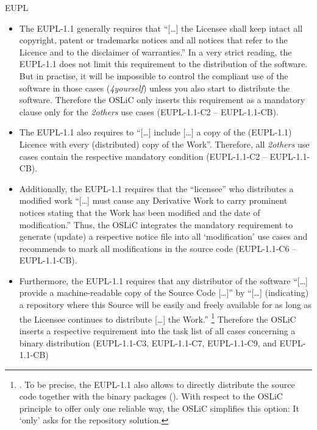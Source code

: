\begin{license}{EUPL}
\begin{itemize}
\item The EUPL-1.1 generally requires that \enquote{[\ldots] the Licensee shall
  keep intact all copyright, patent or trademarks notices and all notices that
  refer to the Licence and to the disclaimer of warranties.} 
  In a very strict reading, the EUPL-1.1 does not limit this requirement to the
  distribution of the software. But in practise, it will be impossible to
  control the compliant use of the software in those cases (\emph{4yourself})
  unless you also start to distribute the software. Therefore the OSLiC only
  inserts this requirement as a mandatory clause only for the \emph{2others} use 
  cases (EUPL-1.1-C2 -- EUPL-1.1-CB). 
  
\item The EUPL-1.1 also requires to \enquote{[\ldots] include [\ldots] a copy of
  the (EUPL-1.1) Licence with every (distributed) copy of the Work}.
  Therefore, all \emph{2others} use cases contain the respective mandatory
  condition (EUPL-1.1-C2 -- EUPL-1.1-CB).
  
\item Additionally, the EUPL-1.1 requires that the \enquote{licensee} who
  distributes a modified work \enquote{[\ldots] must cause any Derivative Work 
  to carry prominent notices stating that the Work has been modified and the
  date of modification.} 
  Thus, the OSLiC integrates the mandatory requirement to generate (update) a
  respective notice file into all `modification' use cases and recommends to mark
  all modifications in the source code (EUPL-1.1-C6 -- EUPL-1.1-CB).
  
\item Furthermore, the EUPL-1.1 requires that any distributor of the software
  \enquote{[\ldots] provide a machine-readable copy of the Source Code [\ldots]}
  by \enquote{[\ldots] (indicating) a repository where this Source will be
  easily and freely available for as long as the Licensee continues to
  distribute [\ldots] the Work.}%
  \footnote{\cite[cf.][\nopage wp.\ §5]{EuplLicense2007en}. To be precise, the
    EUPL-1.1 also allows to directly distribute the source code together with the
    binary packages (\cite[cf.][\nopage wp.\ §3]{EuplLicense2007en}). With
    respect to the OSLiC principle to offer only one reliable way, the OSLiC
    simplifies this option: It `only' asks for the repository solution.} 
  Therefore the OSLiC inserts a respective requirement into the task list of all
  cases concerning a binary distribution (EUPL-1.1-C3, EUPL-1.1-C7, EUPL-1.1-C9, and EUPL-1.1-CB)
  

\end{itemize}
\end{license}
